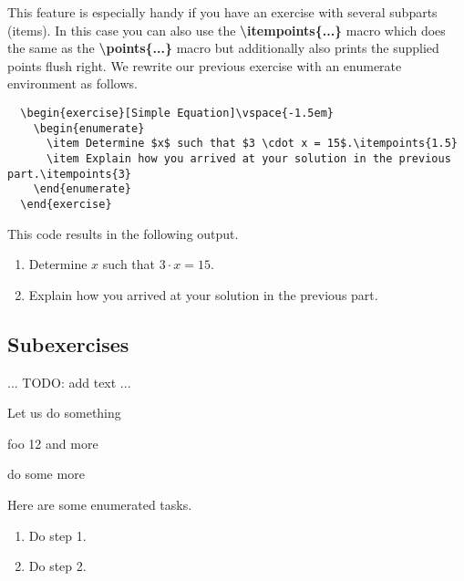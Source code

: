 \documentclass[
  twocolumn,%
  fontsize=9pt,%
  DIV=calc,%
  numbers=noendperiod%
]{scrartcl}
\begin{document}
This feature is especially handy if you have an exercise with several subparts (items). In this case you can also use the \textcolor{NavyBlue}{\ttfamily\bfseries \textbackslash itempoints\{...\}} macro which does the same as the \textcolor{NavyBlue}{\ttfamily\bfseries \textbackslash points\{...\}} macro but additionally also prints the supplied points flush right. We rewrite our previous exercise with an enumerate environment as follows.

\begin{lstlisting}
  \begin{exercise}[Simple Equation]\vspace{-1.5em}
    \begin{enumerate}
      \item Determine $x$ such that $3 \cdot x = 15$.\itempoints{1.5}
      \item Explain how you arrived at your solution in the previous part.\itempoints{3}
    \end{enumerate}
  \end{exercise} 
\end{lstlisting}

\noindent This code results in the following output.
\begin{exercise}\vspace{-1.5em}
  \begin{enumerate}
    \item Determine $x$ such that $3 \cdot x = 15$.
    \item Explain how you arrived at your solution in the previous part.
  \end{enumerate}
\end{exercise}

\subsection{Subexercises}
... TODO: add text ...  

\begin{exercise}
  Let us do something
  \begin{subexercise}
    foo 12 
    and more 
  \end{subexercise}

  \begin{subexercise}
    do some more
  \end{subexercise}

  \begin{subexercise}
    Here are some enumerated tasks.
    \begin{enumerate}
      \item Do step 1.
      \item Do step 2. 
    \end{enumerate}
  \end{subexercise}
\end{exercise}
\end{document}
